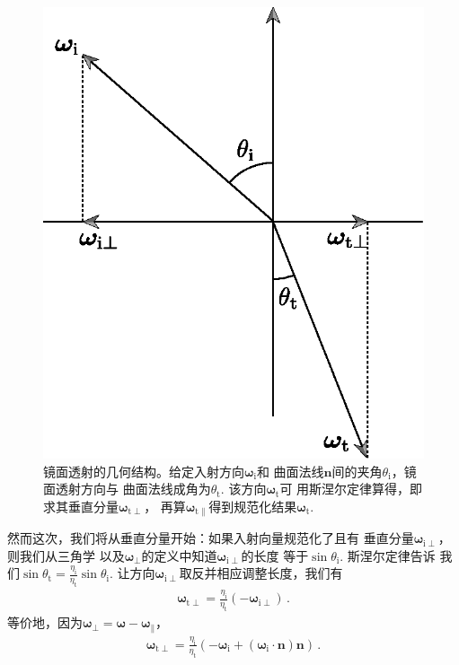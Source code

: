 \begin{figure}[htbp]
    \centering
    \includegraphics[width=0.5\linewidth]{Pictures/chap08/Speculartransmissionprojections.eps}
    \caption{镜面透射的几何结构。给定入射方向${\bm\omega}_{\mathrm{i}}$和
        曲面法线$\bm n$间的夹角$\theta_{\mathrm{i}}$，镜面透射方向与
        曲面法线成角为$\theta_{\mathrm{t}}$. 该方向${\bm\omega}_{\mathrm{t}}$可
        用斯涅尔定律算得，即求其垂直分量${\bm\omega}_{\mathrm{t}\perp}$，
        再算${\bm\omega}_{\mathrm{t}\parallel}$得到规范化结果${\bm\omega}_{\mathrm{t}}$.}
    \label{fig:8.11}
\end{figure}

然而这次，我们将从垂直分量开始：如果入射向量规范化了且有
垂直分量${\bm\omega}_{\mathrm{i}\perp}$，则我们从三角学
以及${\bm\omega}_{\perp}$的定义中知道${\bm\omega}_{\mathrm{i}\perp}$的长度
等于$\sin\theta_{\mathrm{i}}$. 斯涅尔定律告诉
我们$\displaystyle\sin\theta_{\mathrm{t}}=\frac{\eta_{\mathrm{i}}}{\eta_{\mathrm{t}}}\sin\theta_{\mathrm{i}}$.
让方向${\bm\omega}_{\mathrm{i}\perp}$取反并相应调整长度，我们有
\begin{align*}
    {\bm\omega}_{\mathrm{t}\perp}=\frac{\eta_{\mathrm{i}}}{\eta_{\mathrm{t}}}(-{\bm\omega}_{\mathrm{i}\perp})\, .
\end{align*}
等价地，因为${\bm\omega}_{\perp}={\bm\omega}-{\bm\omega}_{\parallel}$，
\begin{align*}
    {\bm\omega}_{\mathrm{t}\perp}=\frac{\eta_{\mathrm{i}}}{\eta_{\mathrm{t}}}(-{\bm\omega}_{\mathrm{i}}+({\bm\omega}_{\mathrm{i}}\cdot{\bm n}){\bm n})\, .
\end{align*}

